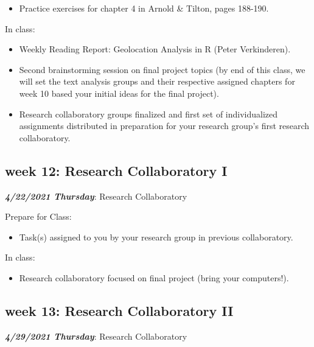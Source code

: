 \documentclass[
]{book}
\providecommand{\tightlist}{%
  \setlength{\itemsep}{0pt}\setlength{\parskip}{0pt}}
\begin{document}
\begin{itemize}
\tightlist
\item
  Practice exercises for chapter 4 in Arnold \& Tilton, pages 188-190.
\end{itemize}

In class:

\begin{itemize}
\tightlist
\item
  Weekly Reading Report: Geolocation Analysis in R (Peter Verkinderen).
\item
  Second brainstorming session on final project topics (by end of this class, we will set the text analysis groups and their respective assigned chapters for week 10 based your initial ideas for the final project).
\item
  Research collaboratory groups finalized and first set of individualized assignments distributed in preparation for your research group's first research collaboratory.
\end{itemize}

\hypertarget{week-12-research-collaboratory-i}{%
\subsection{week 12: Research Collaboratory I}\label{week-12-research-collaboratory-i}}

\textbf{\emph{4/22/2021 Thursday}}: Research Collaboratory

Prepare for Class:

\begin{itemize}
\tightlist
\item
  Task(s) assigned to you by your research group in previous collaboratory.
\end{itemize}

In class:

\begin{itemize}
\tightlist
\item
  Research collaboratory focused on final project (bring your computers!).
\end{itemize}

\hypertarget{week-13-research-collaboratory-ii}{%
\subsection{week 13: Research Collaboratory II}\label{week-13-research-collaboratory-ii}}

\textbf{\emph{4/29/2021 Thursday}}: Research Collaboratory
\end{document}
